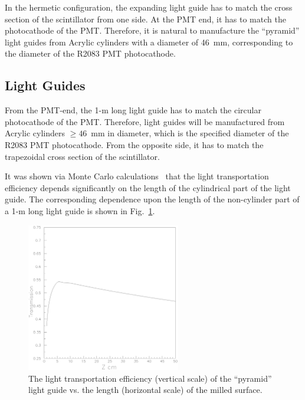 In the hermetic configuration, the expanding light guide has to match the 
cross section of the scintillator from one side.  At the PMT end, it has 
to match the photocathode of the PMT.  Therefore, it is natural to 
manufacture the ``pyramid'' light guides from Acrylic cylinders with a 
diameter of 46~mm, corresponding to the diameter of the R2083 PMT
photocathode.

\subsection{Light Guides} 

From the PMT-end, the 1-m long light guide has to match the circular 
photocathode of the PMT.  Therefore, light guides will be manufactured 
from Acrylic cylinders $\ge 46$~mm in diameter, which is the specified diameter 
of the R2083 PMT photocathode.  From the opposite side, it has to match 
the trapezoidal cross section of the scintillator.

It was shown via Monte Carlo calculations~\cite{mutch} that the light 
transportation efficiency depends significantly on the length of the 
cylindrical part of the light guide.  The corresponding dependence upon 
the length of the non-cylinder part of a 1-m long light guide is shown in 
Fig.~\ref{plgef}.

\begin{figure}[htbp]
\centering
\includegraphics[width=0.6\textwidth]{transitionvscyl.ps}
\caption{\small{The light transportation efficiency (vertical scale) of the 
``pyramid'' light guide vs. the length (horizontal scale) of the milled 
surface.}}
\label{plgef}
\end{figure}

